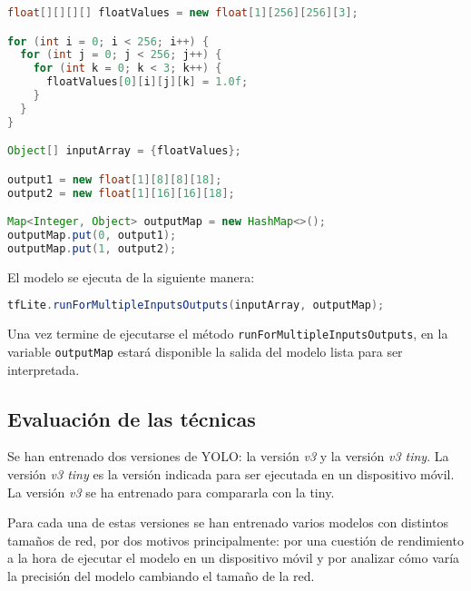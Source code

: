\begin{lstlisting}[frame=single, basicstyle=\ttfamily\footnotesize, language=Java, caption={Creación de vectores de entrada y de salida del modelo}, captionpos=b]
float[][][][] floatValues = new float[1][256][256][3];

for (int i = 0; i < 256; i++) {
  for (int j = 0; j < 256; j++) {
    for (int k = 0; k < 3; k++) {
      floatValues[0][i][j][k] = 1.0f;
    }
  }
}

Object[] inputArray = {floatValues};

output1 = new float[1][8][8][18];
output2 = new float[1][16][16][18];

Map<Integer, Object> outputMap = new HashMap<>();
outputMap.put(0, output1);
outputMap.put(1, output2);
\end{lstlisting}

El modelo se ejecuta de la siguiente manera:

\begin{lstlisting}[frame=single, basicstyle=\ttfamily\footnotesize, language=Java, caption={Cómo ejecutar el modelo}, captionpos=b]
tfLite.runForMultipleInputsOutputs(inputArray, outputMap);
\end{lstlisting}

Una vez termine de ejecutarse el método \texttt{runForMultipleInputsOutputs}, en la variable \texttt{outputMap} estará disponible la salida del modelo lista para ser interpretada.

\subsection{Evaluación de las técnicas}

Se han entrenado dos versiones de YOLO: la versión \textit{v3} y la versión \textit{v3 tiny}. La versión \textit{v3 tiny} es la versión indicada para ser ejecutada en un dispositivo móvil. La versión \textit{v3} se ha entrenado para compararla con la tiny.

Para cada una de estas versiones se han entrenado varios modelos con distintos tamaños de red, por dos motivos principalmente: por una cuestión de rendimiento a la hora de ejecutar el modelo en un dispositivo móvil y por analizar cómo varía la precisión del modelo cambiando el tamaño de la red.

